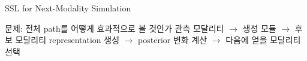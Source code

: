 \documentclass[
11pt,notheorems,hyperref={pdfauthor=whatever}
]{beamer}
\begin{document}
\begin{frame}{SSL for Next-Modality Simulation}
\vspace{0.7em}
\begin{block}{문제: 전체 path를 어떻게 효과적으로 볼 것인가}
\scriptsize
관측 모달리티 $\rightarrow$ 생성 모듈 $\rightarrow$ 후보 모달리티 representation 생성 $\rightarrow$ posterior 변화 계산 $\rightarrow$ 다음에 얻을 모달리티 선택
\end{block}
\end{frame}
\end{document}

